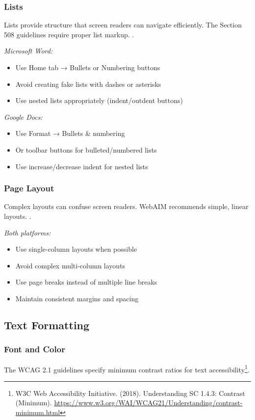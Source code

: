\subsubsection{Lists}
Lists provide structure that screen readers can navigate efficiently. The Section 508 guidelines require proper list markup.
\cite{Section5082018}.

\emph{Microsoft Word:}
\begin{itemize}
\item Use Home tab → Bullets or Numbering buttons
\item Avoid creating fake lists with dashes or asterisks
\item Use nested lists appropriately (indent/outdent buttons)
\end{itemize}

\emph{Google Docs:}
\begin{itemize}
\item Use Format → Bullets \& numbering
\item Or toolbar buttons for bulleted/numbered lists
\item Use increase/decrease indent for nested lists
\end{itemize}

\subsubsection{Page Layout}
Complex layouts can confuse screen readers. WebAIM recommends simple, linear layouts.
\cite{WebAIM2023}.

\emph{Both platforms:}
\begin{itemize}
\item Use single-column layouts when possible
\item Avoid complex multi-column layouts
\item Use page breaks instead of multiple line breaks
\item Maintain consistent margins and spacing
\end{itemize}

\subsection{Text Formatting}

\subsubsection{Font and Color}
The WCAG 2.1 guidelines specify minimum contrast ratios for text accessibility\footnote{W3C Web Accessibility Initiative. (2018). Understanding SC 1.4.3: Contrast (Minimum). \url{https://www.w3.org/WAI/WCAG21/Understanding/contrast-minimum.html}}.

